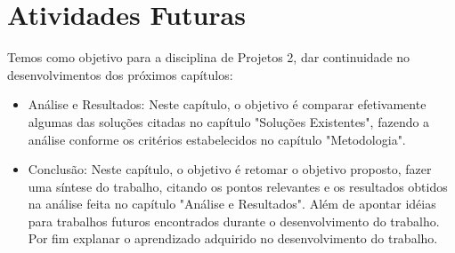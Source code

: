 \chapter{Atividades Futuras}

Temos como objetivo para a disciplina de Projetos 2, dar continuidade no desenvolvimentos dos próximos capítulos:

\begin{itemize}
    \item Análise e Resultados: Neste capítulo, o objetivo é comparar efetivamente algumas das soluções citadas no capítulo "Soluções Existentes", fazendo a análise conforme os critérios estabelecidos no capítulo "Metodologia".
    \item Conclusão: Neste capítulo, o objetivo é retomar o objetivo proposto, fazer uma síntese do trabalho, citando os pontos relevantes e os resultados obtidos na análise feita no capítulo "Análise e Resultados". Além de apontar idéias para trabalhos futuros encontrados durante o desenvolvimento do trabalho. Por fim explanar o aprendizado adquirido no desenvolvimento do trabalho.
\end{itemize}
